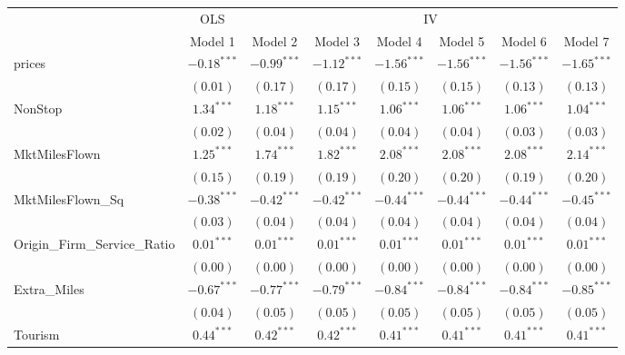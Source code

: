
\begin{tabular}{l c c c c c c c}
\toprule
 & \multicolumn{1}{c}{OLS} & \multicolumn{6}{c}{IV} \\
\cmidrule(lr){2-2} \cmidrule(lr){3-8}
 & Model 1 & Model 2 & Model 3 & Model 4 & Model 5 & Model 6 & Model 7 \\
\midrule
prices                       & $-0.18^{***}$ & $-0.99^{***}$ & $-1.12^{***}$ & $-1.56^{***}$ & $-1.56^{***}$    & $-1.56^{***}$ & $-1.65^{***}$  \\
                             & $(0.01)$      & $(0.17)$      & $(0.17)$      & $(0.15)$      & $(0.15)$         & $(0.13)$      & $(0.13)$       \\
NonStop                      & $1.34^{***}$  & $1.18^{***}$  & $1.15^{***}$  & $1.06^{***}$  & $1.06^{***}$     & $1.06^{***}$  & $1.04^{***}$   \\
                             & $(0.02)$      & $(0.04)$      & $(0.04)$      & $(0.04)$      & $(0.04)$         & $(0.03)$      & $(0.03)$       \\
MktMilesFlown                & $1.25^{***}$  & $1.74^{***}$  & $1.82^{***}$  & $2.08^{***}$  & $2.08^{***}$     & $2.08^{***}$  & $2.14^{***}$   \\
                             & $(0.15)$      & $(0.19)$      & $(0.19)$      & $(0.20)$      & $(0.20)$         & $(0.19)$      & $(0.20)$       \\
MktMilesFlown\_Sq            & $-0.38^{***}$ & $-0.42^{***}$ & $-0.42^{***}$ & $-0.44^{***}$ & $-0.44^{***}$    & $-0.44^{***}$ & $-0.45^{***}$  \\
                             & $(0.03)$      & $(0.04)$      & $(0.04)$      & $(0.04)$      & $(0.04)$         & $(0.04)$      & $(0.04)$       \\
Origin\_Firm\_Service\_Ratio & $0.01^{***}$  & $0.01^{***}$  & $0.01^{***}$  & $0.01^{***}$  & $0.01^{***}$     & $0.01^{***}$  & $0.01^{***}$   \\
                             & $(0.00)$      & $(0.00)$      & $(0.00)$      & $(0.00)$      & $(0.00)$         & $(0.00)$      & $(0.00)$       \\
Extra\_Miles                 & $-0.67^{***}$ & $-0.77^{***}$ & $-0.79^{***}$ & $-0.84^{***}$ & $-0.84^{***}$    & $-0.84^{***}$ & $-0.85^{***}$  \\
                             & $(0.04)$      & $(0.05)$      & $(0.05)$      & $(0.05)$      & $(0.05)$         & $(0.05)$      & $(0.05)$       \\
Tourism                      & $0.44^{***}$  & $0.42^{***}$  & $0.42^{***}$  & $0.41^{***}$  & $0.41^{***}$     & $0.41^{***}$  & $0.41^{***}$   \\

\end{tabular}
